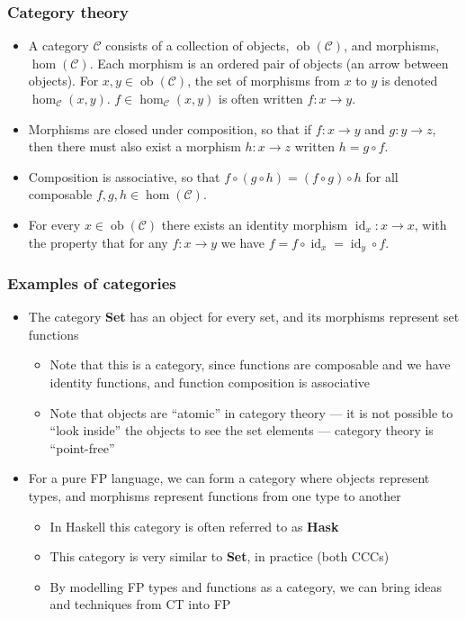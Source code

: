 \documentclass[mathserif,handout]{beamer}
\begin{document}
\begin{frame}[fragile]
  \frametitle{Category theory}
  \begin{itemize}
  \item A category $\mathcal{C}$ consists of a collection of \alert{objects}, $\operatorname{ob}(\mathcal{C})$, and \alert{morphisms}, $\operatorname{hom}(\mathcal{C})$. Each morphism is an ordered pair of objects (an arrow between objects). For $x,y\in \operatorname{ob}(\mathcal{C})$, the set of morphisms from $x$ to $y$ is denoted $\operatorname{hom}_{\mathcal{C}}(x,y)$. $f\in \operatorname{hom}_{\mathcal{C}}(x,y)$ is often written $f: x \longrightarrow y$.
  \item Morphisms are closed under \alert{composition}, so that if $f: x\longrightarrow y$ and $g: y\longrightarrow z$, then there must also exist a morphism $h: x\longrightarrow z$ written $h=g \circ f$.
  \item Composition is associative, so that $f\circ(g\circ h) = (f\circ g)\circ h$ for all composable $f, g, h\in \operatorname{hom}(\mathcal{C})$.
    \item For every $x\in \operatorname{ob}(\mathcal{C})$ there exists an \alert{identity} morphism $\operatorname{id}_x: x\longrightarrow x$, with the property that for any $f: x\longrightarrow y$ we have $f = f\circ \operatorname{id}_x = \operatorname{id}_y\circ f$.
  \end{itemize}
\end{frame}

\begin{frame}[fragile]
  \frametitle{Examples of categories}
  \begin{itemize}
  \item The category \textbf{Set} has an object for every \alert{set}, and its morphisms represent set \alert{functions}
    \begin{itemize}
    \item Note that this is a category, since functions are composable and we have identity functions, and function composition is associative
      \item Note that objects are ``atomic'' in category theory --- it is not possible to ``look inside'' the objects to see the set elements --- category theory is ``point-free''
    \end{itemize}
  \item For a pure FP language, we can form a category where objects represent \alert{types}, and morphisms represent \alert{functions} from one type to another
    \begin{itemize}
      \item In Haskell this category is often referred to as \textbf{Hask}
    \item This category is very similar to \textbf{Set}, in practice (both CCCs)
    \item By modelling FP types and functions as a category, we can bring ideas and techniques from CT into FP
      \end{itemize}
  \end{itemize}
\end{frame}
\end{document}

